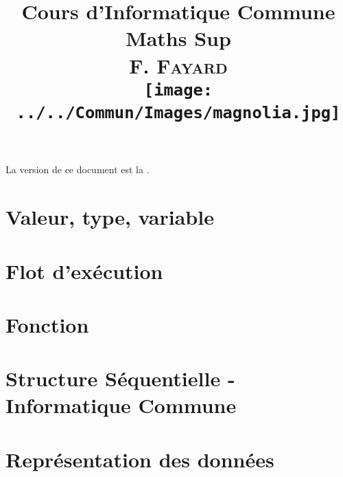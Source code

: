 \documentclass[book]{magnolia}
\title{{\Huge\bf Cours d'Informatique Commune}\\\vspace{1cm}
       \textbf{\Huge Maths Sup}\\\vspace{1cm}
       \textsc{F. Fayard}\\\vspace{1cm}
       \texttt{[image: ../../Commun/Images/magnolia.jpg]}}
\begin{document}
\maketitle

La version de ce document est la \textsc{\GITAbrHash}.

\tableofcontents


\chapter{Valeur, type, variable}
\setcounter{numeroexercicecours}{1}

% 

\chapter{Flot d'exécution}
\setcounter{numeroexercicecours}{1}

% 

\chapter{Fonction}
\setcounter{numeroexercicecours}{1}

% 

\chapter{Structure Séquentielle - Informatique Commune}
\setcounter{numeroexercicecours}{1}

% 

\chapter{Représentation des données}
\setcounter{numeroexercicecours}{1}

% 
\end{document}
